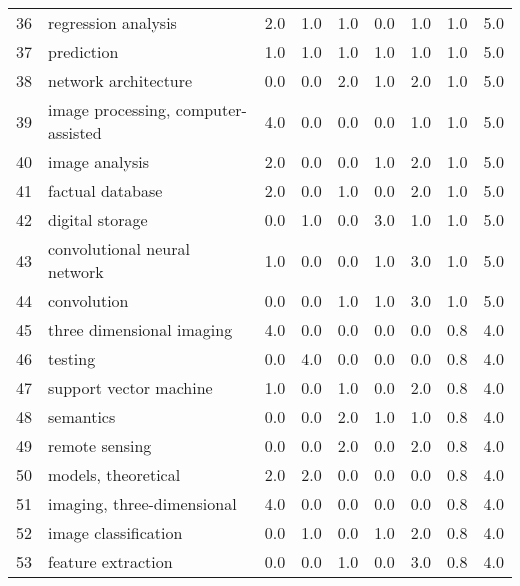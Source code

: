 \begin{tabular}{llrrrrrrr}
36 &                      regression analysis &   2.0 &   1.0 &   1.0 &   0.0 &   1.0 &   1.0 &    5.0 \\
37 &                               prediction &   1.0 &   1.0 &   1.0 &   1.0 &   1.0 &   1.0 &    5.0 \\
38 &                     network architecture &   0.0 &   0.0 &   2.0 &   1.0 &   2.0 &   1.0 &    5.0 \\
39 &      image processing, computer-assisted &   4.0 &   0.0 &   0.0 &   0.0 &   1.0 &   1.0 &    5.0 \\
40 &                           image analysis &   2.0 &   0.0 &   0.0 &   1.0 &   2.0 &   1.0 &    5.0 \\
41 &                         factual database &   2.0 &   0.0 &   1.0 &   0.0 &   2.0 &   1.0 &    5.0 \\
42 &                          digital storage &   0.0 &   1.0 &   0.0 &   3.0 &   1.0 &   1.0 &    5.0 \\
43 &             convolutional neural network &   1.0 &   0.0 &   0.0 &   1.0 &   3.0 &   1.0 &    5.0 \\
44 &                              convolution &   0.0 &   0.0 &   1.0 &   1.0 &   3.0 &   1.0 &    5.0 \\
45 &                three dimensional imaging &   4.0 &   0.0 &   0.0 &   0.0 &   0.0 &   0.8 &    4.0 \\
46 &                                  testing &   0.0 &   4.0 &   0.0 &   0.0 &   0.0 &   0.8 &    4.0 \\
47 &                   support vector machine &   1.0 &   0.0 &   1.0 &   0.0 &   2.0 &   0.8 &    4.0 \\
48 &                                semantics &   0.0 &   0.0 &   2.0 &   1.0 &   1.0 &   0.8 &    4.0 \\
49 &                           remote sensing &   0.0 &   0.0 &   2.0 &   0.0 &   2.0 &   0.8 &    4.0 \\
50 &                      models, theoretical &   2.0 &   2.0 &   0.0 &   0.0 &   0.0 &   0.8 &    4.0 \\
51 &               imaging, three-dimensional &   4.0 &   0.0 &   0.0 &   0.0 &   0.0 &   0.8 &    4.0 \\
52 &                     image classification &   0.0 &   1.0 &   0.0 &   1.0 &   2.0 &   0.8 &    4.0 \\
53 &                       feature extraction &   0.0 &   0.0 &   1.0 &   0.0 &   3.0 &   0.8 &    4.0 \\

\end{tabular}
